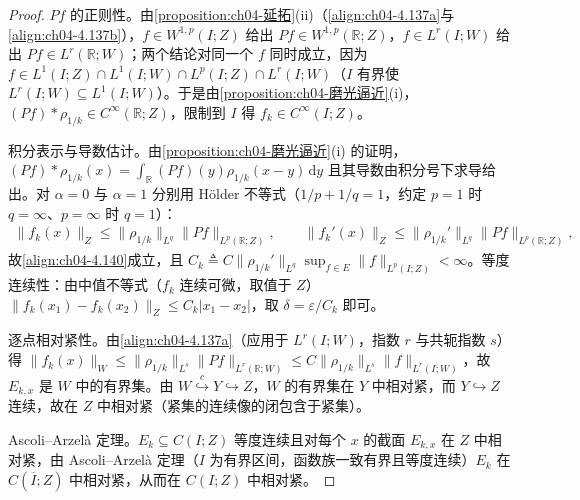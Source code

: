 \documentclass[../../main.tex]{subfiles}%
\begin{document}
\begin{proof}
$Pf$ 的正则性。由\cref{proposition:ch04-延拓}(ii)（\eqref{align:ch04-4.137a}与\eqref{align:ch04-4.137b}），$f\in W^{1,p}(I;Z)$ 给出 $Pf\in W^{1,p}(\mathbb{R};Z)$，$f\in L^r(I;W)$ 给出 $Pf\in L^r(\mathbb{R};W)$；两个结论对同一个 $f$ 同时成立，因为 $f\in L^1(I;Z)\cap L^1(I;W)\cap L^p(I;Z)\cap L^r(I;W)$（$I$ 有界使 $L^r(I;W)\subseteq L^1(I;W)$）。于是由\cref{proposition:ch04-磨光逼近}(i)，$(Pf)*\rho_{1/k}\in C^\infty(\mathbb{R};Z)$，限制到 $I$ 得 $f_k\in C^\infty(I;Z)$。

积分表示与导数估计。由\cref{proposition:ch04-磨光逼近}(i) 的证明，$(Pf)*\rho_{1/k}(x)=\int_{\mathbb{R}}(Pf)(y)\rho_{1/k}(x-y)\,\mathrm{d}y$ 且其导数由积分号下求导给出。对 $\alpha=0$ 与 $\alpha=1$ 分别用 Hölder 不等式（$1/p+1/q=1$，约定 $p=1$ 时 $q=\infty$、$p=\infty$ 时 $q=1$）：
\begin{align*}
\|f_k(x)\|_Z\leqslant\|\rho_{1/k}\|_{L^q}\|Pf\|_{L^p(\mathbb{R};Z)},\qquad\|f_k'(x)\|_Z\leqslant\|\rho_{1/k}'\|_{L^q}\|Pf\|_{L^p(\mathbb{R};Z)} ,
\end{align*}
故\eqref{align:ch04-4.140}成立，且 $C_k\triangleq C\|\rho_{1/k}'\|_{L^q}\sup_{f\in E}\|f\|_{L^p(I;Z)}<\infty$。等度连续性：由中值不等式（$f_k$ 连续可微，取值于 $Z$）$\|f_k(x_1)-f_k(x_2)\|_Z\leqslant C_k|x_1-x_2|$，取 $\delta=\varepsilon/C_k$ 即可。

逐点相对紧性。由\eqref{align:ch04-4.137a}（应用于 $L^r(I;W)$，指数 $r$ 与共轭指数 $s$）得 $\|f_k(x)\|_W\leqslant\|\rho_{1/k}\|_{L^s}\|Pf\|_{L^r(\mathbb{R};W)}\leqslant C\|\rho_{1/k}\|_{L^s}\|f\|_{L^r(I;W)}$，故 $E_{k,x}$ 是 $W$ 中的有界集。由 $W\overset{c}{\hookrightarrow}Y\hookrightarrow Z$，$W$ 的有界集在 $Y$ 中相对紧，而 $Y\hookrightarrow Z$ 连续，故在 $Z$ 中相对紧（紧集的连续像的闭包含于紧集）。

Ascoli--Arzelà 定理。$E_k\subseteq C(I;Z)$ 等度连续且对每个 $x$ 的截面 $E_{k,x}$ 在 $Z$ 中相对紧，由 Ascoli--Arzelà 定理（$I$ 为有界区间，函数族一致有界且等度连续）$E_k$ 在 $C(\overline I;Z)$ 中相对紧，从而在 $C(I;Z)$ 中相对紧。
\end{proof}
\end{document}
